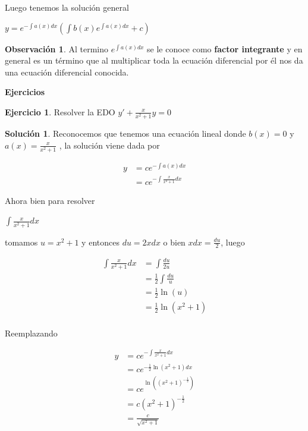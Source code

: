 \documentclass{article}
\theoremstyle{plain}
\theoremstyle{definition}
\newtheorem{ejer}[thm]{Ejercicio}
\newtheorem{sol}[thm]{Solución}
\newtheorem{rmk}[thm]{Observación}
\begin{document}
Luego tenemos la solución general


\begin{center}
$\displaystyle y = e^{ -\int a(x)dx}\left(  \int b(x) e^{ \int a(x)dx} +c  \right) $
\end{center}

\begin{rmk}Al termino  $\displaystyle e^{ \int a(x)dx}$ se le conoce como \textbf{factor integrante} y en general es un término que al multiplicar toda la ecuación diferencial por él nos da una ecuación diferencial conocida. \\
\end{rmk}


\begin{center}
\textbf{\large{Ejercicios}} \\
\end{center}

\begin{ejer}Resolver la EDO $\displaystyle y' + \frac{x}{x^2+1} y = 0$ \\
\end{ejer}


\begin{sol}Reconocemos que tenemos una ecuación lineal donde $b(x)=0$ y $a(x)= \displaystyle \frac{x}{x^2+1}$ , la solución viene dada por
\end{sol}

\begin{align*}
\displaystyle y &= ce^{-\int a(x)dx} \\
&= ce^{-\int \frac{x}{x^2+1}dx}
\end{align*}

Ahora bien para resolver

\begin{center}
$\displaystyle \int \frac{x}{x^2+1}dx $
\end{center}

tomamos $u=x^2+1$ y entonces $du=2xdx$ o bien $xdx=\frac{du}{2} $, luego

\begin{align*}
\displaystyle \int \frac{x}{x^2+1}dx &= \int \frac{du}{2u} \\
&= \frac{1}{2}\int \frac{du}{u} \\
&= \frac{1}{2}\ln(u) \\
&= \frac{1}{2}\ln(x^2+1) \\
\end{align*}

Reemplazando


\begin{align*}
\displaystyle y  &= ce^{-\int \frac{x}{x^2+1}dx} \\
 &= ce^{-\frac{1}{2} \ln(x^2+1) dx} \\
 &= ce^{\ln\left( (x^2+1)^{-\frac{1}{2} }\right)  } \\
 &= c(x^2+1)^{-\frac{1}{2} }  \\
  &= \frac{c}{\sqrt{x^2+1}} \\
\end{align*}
\end{document}
